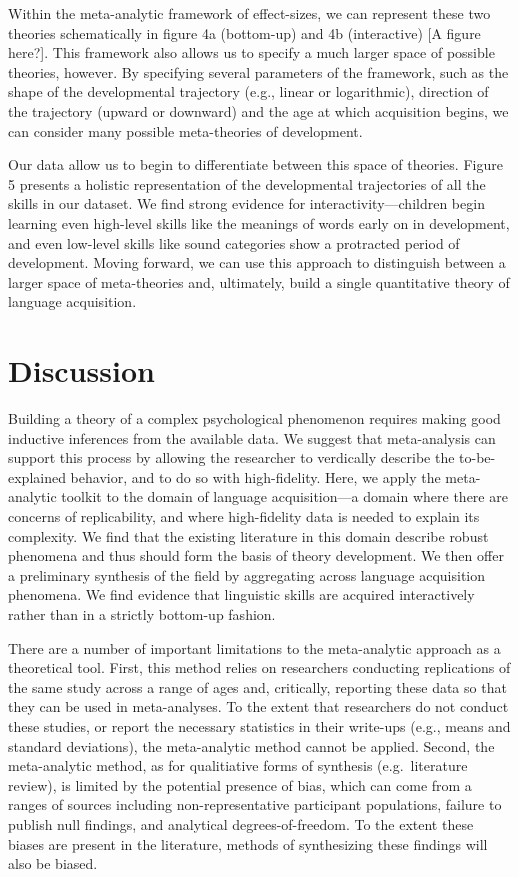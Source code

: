 \documentclass[english,floatsintext,man]{apa6}
\begin{document}
Within the meta-analytic framework of effect-sizes, we can represent
these two theories schematically in figure 4a (bottom-up) and 4b
(interactive) {[}A figure here?{]}. This framework also allows us to
specify a much larger space of possible theories, however. By specifying
several parameters of the framework, such as the shape of the
developmental trajectory (e.g., linear or logarithmic), direction of the
trajectory (upward or downward) and the age at which acquisition begins,
we can consider many possible meta-theories of development.

Our data allow us to begin to differentiate between this space of
theories. Figure 5 presents a holistic representation of the
developmental trajectories of all the skills in our dataset. We find
strong evidence for interactivity---children begin learning even
high-level skills like the meanings of words early on in development,
and even low-level skills like sound categories show a protracted period
of development. Moving forward, we can use this approach to distinguish
between a larger space of meta-theories and, ultimately, build a single
quantitative theory of language acquisition.

\section{Discussion}\label{discussion}

Building a theory of a complex psychological phenomenon requires making
good inductive inferences from the available data. We suggest that
meta-analysis can support this process by allowing the researcher to
verdically describe the to-be-explained behavior, and to do so with
high-fidelity. Here, we apply the meta-analytic toolkit to the domain of
language acquisition---a domain where there are concerns of
replicability, and where high-fidelity data is needed to explain its
complexity. We find that the existing literature in this domain describe
robust phenomena and thus should form the basis of theory development.
We then offer a preliminary synthesis of the field by aggregating across
language acquisition phenomena. We find evidence that linguistic skills
are acquired interactively rather than in a strictly bottom-up fashion.

There are a number of important limitations to the meta-analytic
approach as a theoretical tool. First, this method relies on researchers
conducting replications of the same study across a range of ages and,
critically, reporting these data so that they can be used in
meta-analyses. To the extent that researchers do not conduct these
studies, or report the necessary statistics in their write-ups (e.g.,
means and standard deviations), the meta-analytic method cannot be
applied. Second, the meta-analytic method, as for qualitiative forms of
synthesis (e.g.~literature review), is limited by the potential presence
of bias, which can come from a ranges of sources including
non-representative participant populations, failure to publish null
findings, and analytical degrees-of-freedom. To the extent these biases
are present in the literature, methods of synthesizing these findings
will also be biased.
\end{document}
